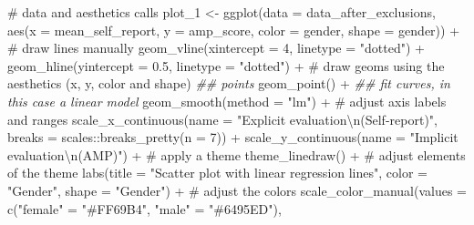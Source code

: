 \documentclass[
  letterpaper,
  DIV=11,
  numbers=noendperiod]{scrreprt}
\newenvironment{Shaded}{\begin{snugshade}}{\end{snugshade}}
\newcommand{\AttributeTok}[1]{\textcolor[rgb]{0.40,0.45,0.13}{#1}}
\newcommand{\CommentTok}[1]{\textcolor[rgb]{0.37,0.37,0.37}{#1}}
\newcommand{\DecValTok}[1]{\textcolor[rgb]{0.68,0.00,0.00}{#1}}
\newcommand{\DocumentationTok}[1]{\textcolor[rgb]{0.37,0.37,0.37}{\textit{#1}}}
\newcommand{\FloatTok}[1]{\textcolor[rgb]{0.68,0.00,0.00}{#1}}
\newcommand{\FunctionTok}[1]{\textcolor[rgb]{0.28,0.35,0.67}{#1}}
\newcommand{\NormalTok}[1]{\textcolor[rgb]{0.00,0.23,0.31}{#1}}
\newcommand{\OtherTok}[1]{\textcolor[rgb]{0.00,0.23,0.31}{#1}}
\newcommand{\SpecialCharTok}[1]{\textcolor[rgb]{0.37,0.37,0.37}{#1}}
\newcommand{\StringTok}[1]{\textcolor[rgb]{0.13,0.47,0.30}{#1}}
\begin{document}
\begin{Shaded}
\begin{Highlighting}[]
\CommentTok{\# data and aesthetics calls}
\NormalTok{plot\_1 }\OtherTok{\textless{}{-}} 
  \FunctionTok{ggplot}\NormalTok{(}\AttributeTok{data =}\NormalTok{ data\_after\_exclusions,}
         \FunctionTok{aes}\NormalTok{(}\AttributeTok{x =}\NormalTok{ mean\_self\_report,}
             \AttributeTok{y =}\NormalTok{ amp\_score,}
             \AttributeTok{color =}\NormalTok{ gender,}
             \AttributeTok{shape =}\NormalTok{ gender)) }\SpecialCharTok{+}
  \CommentTok{\# draw lines manually}
  \FunctionTok{geom\_vline}\NormalTok{(}\AttributeTok{xintercept =} \DecValTok{4}\NormalTok{, }\AttributeTok{linetype =} \StringTok{"dotted"}\NormalTok{) }\SpecialCharTok{+}
  \FunctionTok{geom\_hline}\NormalTok{(}\AttributeTok{yintercept =} \FloatTok{0.5}\NormalTok{, }\AttributeTok{linetype =} \StringTok{"dotted"}\NormalTok{) }\SpecialCharTok{+}
  \CommentTok{\# draw geoms using the aesthetics (x, y, color and shape)}
  \DocumentationTok{\#\# points}
  \FunctionTok{geom\_point}\NormalTok{() }\SpecialCharTok{+}
  \DocumentationTok{\#\# fit curves, in this case a linear model}
  \FunctionTok{geom\_smooth}\NormalTok{(}\AttributeTok{method =} \StringTok{"lm"}\NormalTok{) }\SpecialCharTok{+}
  \CommentTok{\# adjust axis labels and ranges}
  \FunctionTok{scale\_x\_continuous}\NormalTok{(}\AttributeTok{name =} \StringTok{"Explicit evaluation}\SpecialCharTok{\textbackslash{}n}\StringTok{(Self{-}report)"}\NormalTok{,}
                     \AttributeTok{breaks =}\NormalTok{ scales}\SpecialCharTok{::}\FunctionTok{breaks\_pretty}\NormalTok{(}\AttributeTok{n =} \DecValTok{7}\NormalTok{)) }\SpecialCharTok{+}
  \FunctionTok{scale\_y\_continuous}\NormalTok{(}\AttributeTok{name =} \StringTok{"Implicit evaluation}\SpecialCharTok{\textbackslash{}n}\StringTok{(AMP)"}\NormalTok{) }\SpecialCharTok{+}
  \CommentTok{\# apply a theme}
  \FunctionTok{theme\_linedraw}\NormalTok{() }\SpecialCharTok{+} 
  \CommentTok{\# adjust elements of the theme}
  \FunctionTok{labs}\NormalTok{(}\AttributeTok{title =} \StringTok{"Scatter plot with linear regression lines"}\NormalTok{,}
       \AttributeTok{color =} \StringTok{"Gender"}\NormalTok{,}
       \AttributeTok{shape =} \StringTok{"Gender"}\NormalTok{) }\SpecialCharTok{+}
  \CommentTok{\# adjust the colors }
  \FunctionTok{scale\_color\_manual}\NormalTok{(}\AttributeTok{values =} \FunctionTok{c}\NormalTok{(}\StringTok{"female"} \OtherTok{=} \StringTok{"\#FF69B4"}\NormalTok{,}
                                \StringTok{"male"} \OtherTok{=} \StringTok{"\#6495ED"}\NormalTok{),}

\end{Highlighting}
\end{Shaded}
\end{document}
